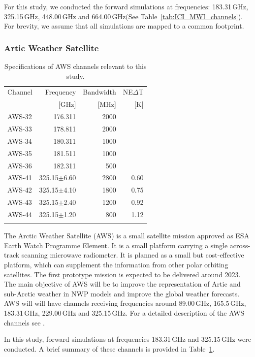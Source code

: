 \documentclass[amt, manuscript]{copernicus}
\begin{document}
For this study, we conducted the forward simulations at frequencies: 183.31\,GHz, 325.15\,GHz, 448.00\,GHz and 664.00\,GHz(See Table~\ref{tab:ICI_MWI_channels}). For brevity, we assume that all simulations are mapped to a common footprint.

\subsubsection{Artic Weather Satellite}
%
\begin{table}[t]
	\caption{Specifications of AWS channels relevant to this study.}
	\label{tab:specifications_AWS}	
	\begin{tabular}{lrrr}
		\tophline
		Channel & Frequency 	& Bandwidth & NE$\Delta$T \\
				& [GHz]			& [MHz]		& [K]		\\
		\middlehline
		AWS-32	&	176.311    & 2000	&		\\
		AWS-33	&	178.811    & 2000 	&	\\
		AWS-34	&	180.311    & 1000 	&	\\
		AWS-35	&	181.511    & 1000 	&	 \\
		AWS-36	&	182.311    & \phantom{0}500  &	 \\
		AWS-41  & 325.15$\pm$6.60    & 2800 	 &0.60\\
		AWS-42  & 325.15$\pm$4.10    & 1800    &0.75	\\
		AWS-43  & 325.15$\pm$2.40    & 1200    &0.92\\
		AWS-44  & 325.15$\pm$1.20    & \phantom{0}800  &1.12  \\
		\bottomhline
	\end{tabular}
	\belowtable{} %
\end{table}
The Arctic Weather Satellite (AWS) is a small satellite mission approved as ESA
Earth Watch Programme Element. It is a small platform carrying a single across-track scanning microwave radiometer. It is planned as a small but cost-effective platform, which can supplement the information from other polar orbiting satellites. The first prototype mission is expected to be delivered around 2023. The main objective of AWS will be to improve the representation of Artic and sub-Arctic weather in NWP models and improve the global weather forecasts. AWS will will have channels receiving frequencies around 89.00\,GHz, 165.5\,GHz, 183.31\,GHz, 229.00\,GHz and 325.15\,GHz. For a detailed description of the AWS channels see \citet{eriksson2020study}. 

In this study, forward simulations at frequencies 183.31\,GHz and 325.15\,GHz were conducted. A brief summary of these channels is provided in Table~\ref{tab:specifications_AWS}.
\end{document}
